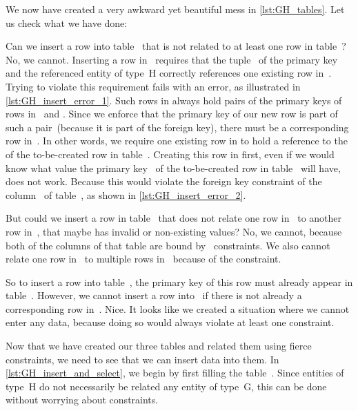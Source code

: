 We now have created a very awkward yet beautiful mess in \cref{lst:GH_tables}.
Let us check what we have done:

Can we insert a row into table~ that is not related to at least one row in table~?
No, we cannot.
Inserting a row in~ requires that the tuple~ of the primary key~ and the referenced entity of type~H correctly references one existing row in~.
Trying to violate this requirement fails with an error, as illustrated in \cref{lst:GH_insert_error_1}.
Such rows in  always hold pairs of the primary keys of rows in~ and .
Since we enforce that the primary key of our new row is part of such a pair~(because it is part of the foreign key), there must be a corresponding row in~.
In other words, we require one existing row in  to hold a reference to the  of the to-be-created row in table~.
Creating this row in  first, even if we would know what value the primary key~ of the to-be-created row in table~ will have, does not work.
Because this would violate the foreign key  constraint of the column~ of table~, as shown in \cref{lst:GH_insert_error_2}.

But could we insert a row in table~ that does not relate one row in~ to another row in~, that maybe has invalid or non-existing values?
No, we cannot, because both of the columns of that table are bound by~ constraints.
We also cannot relate one row in~ to multiple rows in~ because of the  constraint.%
%
\begin{sloppypar}%
So to insert a row into table~, the primary key of this row must already appear in table~.
However, we cannot insert a row into~ if there is not already a corresponding row in~.
Nice.
It looks like we created a situation where we cannot enter any data, because doing so would always violate at least one constraint.%
\end{sloppypar}%
%
Now that we have created our three tables and related them using fierce constraints, we need to see that we can insert data into them.
In \cref{lst:GH_insert_and_select}, we begin by first filling the table~.
Since entities of type~H do not necessarily be related any entity of type~G, this can be done without worrying about constraints.

